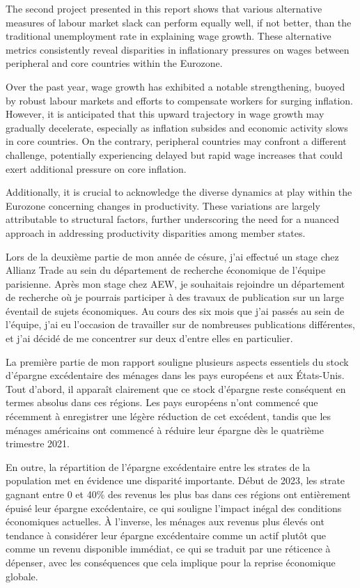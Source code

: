 The second project presented in this report shows that various alternative measures of labour market slack can perform equally well, if not better, than the traditional unemployment rate in explaining wage growth. 
These alternative metrics consistently reveal disparities in inflationary pressures on wages between peripheral and core countries within the Eurozone.

Over the past year, wage growth has exhibited a notable strengthening, buoyed by robust labour markets and efforts to compensate workers for surging inflation. 
However, it is anticipated that this upward trajectory in wage growth may gradually decelerate, especially as inflation subsides and economic activity slows in core countries. 
On the contrary, peripheral countries may confront a different challenge, potentially experiencing delayed but rapid wage increases that could exert additional pressure on core inflation.

Additionally, it is crucial to acknowledge the diverse dynamics at play within the Eurozone concerning changes in productivity. 
These variations are largely attributable to structural factors, further underscoring the need for a nuanced approach in addressing productivity disparities among member states.

Lors de la deuxième partie de mon année de césure, j'ai effectué un stage chez Allianz Trade au sein du département de recherche économique de l'équipe parisienne. 
Après mon stage chez AEW, je souhaitais rejoindre un département de recherche où je pourrais participer à des travaux de publication sur un large éventail de sujets économiques. 
Au cours des six mois que j'ai passés au sein de l'équipe, j'ai eu l'occasion de travailler sur de nombreuses publications différentes, et j'ai décidé de me concentrer sur deux d'entre elles en particulier.

La première partie de mon rapport souligne plusieurs aspects essentiels du stock d'épargne excédentaire des ménages dans les pays européens et aux États-Unis. 
Tout d'abord, il apparaît clairement que ce stock d'épargne reste conséquent en termes absolus dans ces régions. 
Les pays européens n'ont commencé que récemment à enregistrer une légère réduction de cet excédent, tandis que les ménages américains ont commencé à réduire leur épargne dès le quatrième trimestre 2021.

En outre, la répartition de l'épargne excédentaire entre les strates de la population met en évidence une disparité importante. 
Début de 2023, les strate gagnant entre 0 et 40\% des revenus les plus bas dans ces régions ont entièrement épuisé leur épargne excédentaire, ce qui souligne l'impact inégal des conditions économiques actuelles. 
À l'inverse, les ménages aux revenus plus élevés ont tendance à considérer leur épargne excédentaire comme un actif plutôt que comme un revenu disponible immédiat, ce qui se traduit par une réticence à dépenser, avec les conséquences que cela implique pour la reprise économique globale.

